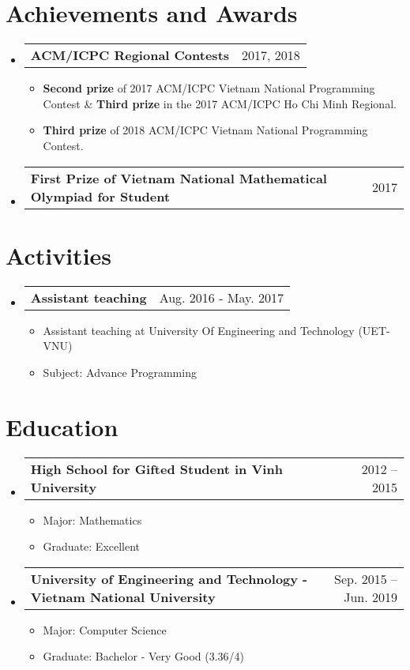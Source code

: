 \documentclass[letterpaper,11pt]{article}
\makeatletter
\newcommand{\resumeItem}[1]{
  \item\small{
    {#1 \vspace{-2pt}}
  }
}
\newcommand{\resumeSubheadTwo}[2]{
  \vspace{-1pt}\item
    \begin{tabular*}{0.97\textwidth}{l@{\extracolsep{\fill}}r}
      \textbf{#1} & #2
    \end{tabular*}\vspace{-5pt}
}
\newcommand{\resumeSubHeadingListStart}{\begin{itemize}[leftmargin=*]}
\newcommand{\resumeSubHeadingListEnd}{\end{itemize}}
\newcommand{\resumeItemListStart}{\begin{itemize}}
\newcommand{\resumeItemListEnd}{\end{itemize}\vspace{-5pt}}
\makeatother
\begin{document}
\section{Achievements and Awards}
  \resumeSubHeadingListStart

    \resumeSubheadTwo
      {ACM/ICPC Regional Contests}{2017, 2018}
      \resumeItemListStart
        \resumeItem{\textbf{Second prize} of 2017 ACM/ICPC Vietnam National Programming Contest \& \textbf{Third prize} in the 2017 ACM/ICPC Ho Chi Minh Regional.}
        \resumeItem{\textbf{Third prize} of 2018 ACM/ICPC Vietnam National Programming Contest.}
        
      \resumeItemListEnd

    \resumeSubheadTwo
      {First Prize of Vietnam National Mathematical Olympiad for Student}{2017}
      \resumeItemListStart
      \resumeItemListEnd

  \resumeSubHeadingListEnd


\section{Activities}
  \resumeSubHeadingListStart

    \resumeSubheadTwo
      {Assistant teaching}{Aug. 2016 - May. 2017}
      \resumeItemListStart
        \resumeItem{Assistant teaching at University Of Engineering and Technology (UET-VNU)}
        \resumeItem{Subject: Advance Programming}
      \resumeItemListEnd

  \resumeSubHeadingListEnd


\section{Education}
  \resumeSubHeadingListStart
  
      \resumeSubheadTwo
      {High School for Gifted Student in Vinh University}{2012 -- 2015}
      \resumeItemListStart
        \resumeItem{Major: Mathematics}
        \resumeItem{Graduate: Excellent}
      \resumeItemListEnd

      \resumeSubheadTwo
      {University of Engineering and Technology - Vietnam National University}{Sep. 2015 -- Jun. 2019}
      \resumeItemListStart
        \resumeItem{Major: Computer Science}
        \resumeItem{Graduate: Bachelor - Very Good (3.36/4)}
      \resumeItemListEnd
      
\resumeSubHeadingListEnd
\end{document}
